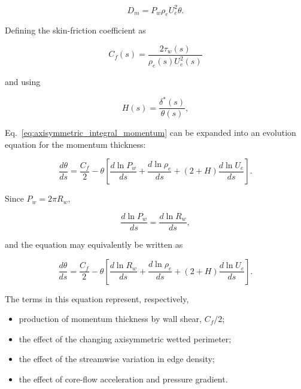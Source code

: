 \begin{equation}
    D_m=P_w\rho_eU_e^2\theta.
\end{equation}

Defining the skin-friction coefficient as

\begin{equation}
    \boxed{
    C_f(s)
    =
    \frac{2\tau_w(s)}
         {\rho_e(s)U_e^2(s)}
    }
    \label{eq:skin_friction_closure_problem}
\end{equation}

and using

\begin{equation}
    H(s)=\frac{\delta^*(s)}{\theta(s)},
\end{equation}

Eq.~\eqref{eq:axisymmetric_integral_momentum} can be expanded into an
evolution equation for the momentum thickness:

\begin{equation}
    \boxed{
    \frac{d\theta}{ds}
    =
    \frac{C_f}{2}
    -
    \theta
    \left[
        \frac{d\ln P_w}{ds}
        +
        \frac{d\ln\rho_e}{ds}
        +
        (2+H)\frac{d\ln U_e}{ds}
    \right]
    }.
    \label{eq:momentum_thickness_evolution}
\end{equation}

Since \(P_w=2\pi R_w\),

\begin{equation}
    \frac{d\ln P_w}{ds}
    =
    \frac{d\ln R_w}{ds},
\end{equation}

and the equation may equivalently be written as

\begin{equation}
    \boxed{
    \frac{d\theta}{ds}
    =
    \frac{C_f}{2}
    -
    \theta
    \left[
        \frac{d\ln R_w}{ds}
        +
        \frac{d\ln\rho_e}{ds}
        +
        (2+H)\frac{d\ln U_e}{ds}
    \right]
    }.
    \label{eq:momentum_thickness_evolution_radius}
\end{equation}

The terms in this equation represent, respectively,

\begin{itemize}
    \item production of momentum thickness by wall shear, \(C_f/2\);
    \item the effect of the changing axisymmetric wetted perimeter;
    \item the effect of the streamwise variation in edge density;
    \item the effect of core-flow acceleration and pressure gradient.
\end{itemize}

